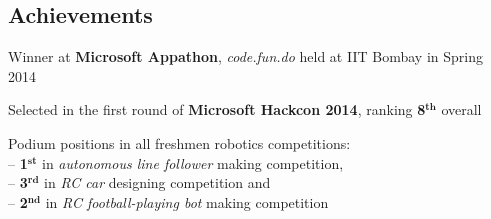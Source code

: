 \documentclass[margin,11pt]{resume}
\begin{document}
\begin{resume}
\section{\mysidestyle Achievements}
\begin{list2}
\item Winner at \textbf{Microsoft Appathon}, \textsl{code.fun.do} held at IIT Bombay in Spring 2014
\item Selected in the first round of \textbf{Microsoft Hackcon 2014}, ranking \textbf{8$^{\textbf{th}}$} overall
\item Podium positions in all freshmen robotics competitions: \\
-- \textbf{1$^{\textbf{st}}$} in \textsl{autonomous line follower} making competition,\\ -- \textbf{3$^{\textbf{rd}}$} in \textsl{RC car} designing competition and\\ 
-- \textbf{2$^{\textbf{nd}}$} in \textsl{RC football-playing bot} making competition
\end{list2}


\end{resume}
\end{document}
